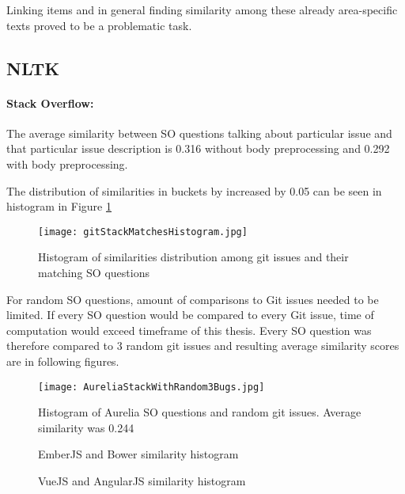 Linking items and in general finding similarity among these already area-specific texts proved to be a problematic task. 

\subsection{NLTK}
\paragraph{Stack Overflow:}
The average similarity between SO questions talking about particular issue and that particular issue description is 0.316 without body preprocessing and 0.292 with body preprocessing.

The distribution of similarities in buckets by increased by 0.05 can be seen in histogram in Figure \ref{fig:GitStackMatchesHistogram}

\begin{figure}[H]%
    \centering
	\texttt{[image: gitStackMatchesHistogram.jpg]}
    \caption{Histogram of similarities distribution among git issues and their matching SO questions}%
    \label{fig:GitStackMatchesHistogram}%
\end{figure}

For random SO questions, amount of comparisons to Git issues needed to be limited. If every SO question would be compared to every Git issue, time of computation would exceed timeframe of this thesis. Every SO question was therefore compared to 3 random git issues and resulting average similarity scores are in following figures.

\begin{figure}[H]%
    \centering
	\texttt{[image: AureliaStackWithRandom3Bugs.jpg]}
    \caption{Histogram of Aurelia SO questions and random git issues. Average similarity was 0.244}%
    \label{fig:AureliaStackWithRandom3Bugs}%
\end{figure}


\begin{figure}[H]%
    \centering
    \qquad
    \caption{EmberJS and Bower similarity histogram}%
    \label{fig:BowerEmberWithRandom3Bugs}%
\end{figure}

\begin{figure}[H]%
    \centering
    \qquad
    \caption{VueJS and AngularJS similarity histogram}%
    \label{fig:VueAngularWithRandom3Bugs}%
\end{figure}


